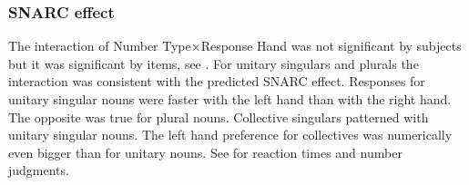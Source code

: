 \documentclass[output=paper]{langscibook}
\begin{document}
\subsubsection{SNARC effect}
The interaction of Number Type×Response Hand was not significant by subjects but it was significant by items, see . For unitary singulars and plurals the interaction was consistent with the predicted SNARC effect. Responses for unitary singular nouns were faster with the left hand than with the right hand. The opposite was true for plural nouns. Collective singulars patterned with unitary singular nouns. The left hand preference for collectives was numerically even bigger than for unitary nouns. See  for reaction times and number judgments.

\end{document}
